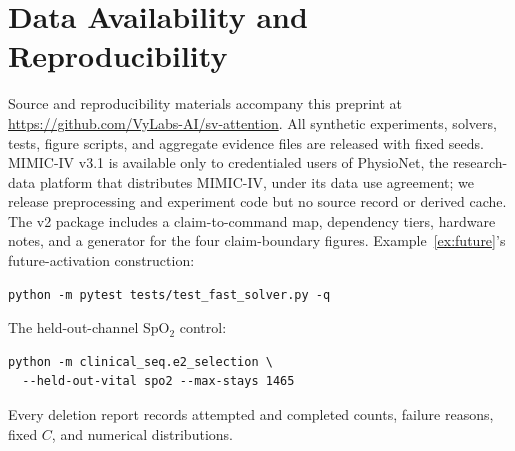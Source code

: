 \section*{Data Availability and Reproducibility}

Source and reproducibility materials accompany this preprint at
\url{https://github.com/VyLabs-AI/sv-attention}.
All synthetic experiments, solvers, tests, figure scripts, and aggregate
evidence files are released with fixed seeds. MIMIC-IV v3.1 is available only
to credentialed users of PhysioNet, the research-data platform that distributes
MIMIC-IV, under its data use agreement; we release
preprocessing and experiment code but no source record or derived cache. The
v2 package includes a claim-to-command map, dependency tiers, hardware notes,
and a generator for the four claim-boundary figures.
Example~\ref{ex:future}'s future-activation construction:
\begingroup
\small
\begin{verbatim}
python -m pytest tests/test_fast_solver.py -q
\end{verbatim}
\endgroup
The held-out-channel SpO\(_2\) control:
\begingroup
\small
\begin{verbatim}
python -m clinical_seq.e2_selection \
  --held-out-vital spo2 --max-stays 1465
\end{verbatim}
\endgroup
Every deletion report records attempted and completed counts, failure reasons,
fixed \(C\), and numerical distributions.

